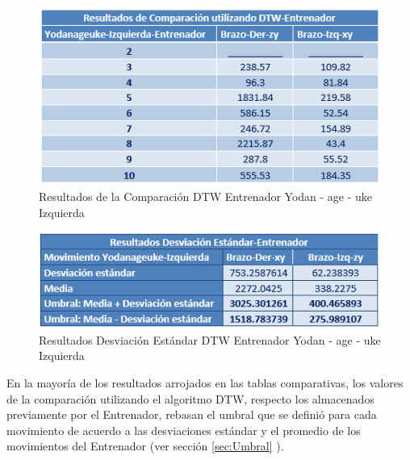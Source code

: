\begin{figure}[H]%
	\begin{center}
		\includegraphics[scale=1]{./Figuras/Implementacion/Pruebas/Tablas/ResultadosDTW_Entrenador_Yodanageuke-Izquierdo}
	\end{center}
	\caption{Resultados de la Comparación DTW Entrenador Yodan - age - uke Izquierda}
	\label{fig:ResultadosDTW_Entrenador_Yodanageuke-Izquierdo}
\end{figure}
\begin{figure}[H]%
	\begin{center}
		\includegraphics[scale=1]{./Figuras/Implementacion/Pruebas/Tablas/ResultadorDesvEstandar_Entrenador_Yodanageuke-Izquierdo}
	\end{center}
	\caption{Resultados Desviación Estándar DTW Entrenador Yodan - age - uke Izquierda}
	\label{fig:ResultadosDTW_Entrenador_Yodanageuke-Izquierdo}
\end{figure}


En la mayoría de los resultados arrojados en las tablas comparativas, los valores de la comparación utilizando el algoritmo DTW, respecto los almacenados previamente por el Entrenador, rebasan el umbral que se definió para cada movimiento de acuerdo a las desviaciones estándar y el promedio de los movimientos del Entrenador (ver sección \ref{sec:Umbral} ).\\
